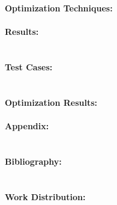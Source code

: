 \documentclass[11pt, oneside]{article}
\begin{document}
\section{}
\paragraph
{\bfseries Optimization Techniques:}

\pagebreak
\paragraph
{\bfseries Results:}

\section{}
\paragraph
{\bfseries Test Cases:}

\section{}
\paragraph
{\bfseries Optimization Results:}

\pagebreak
\paragraph
{\bfseries Appendix:}

\section{}
\paragraph
{\bfseries Bibliography:}

\section{}
\paragraph
{\bfseries Work Distribution:}

\section{}
\end{document}

